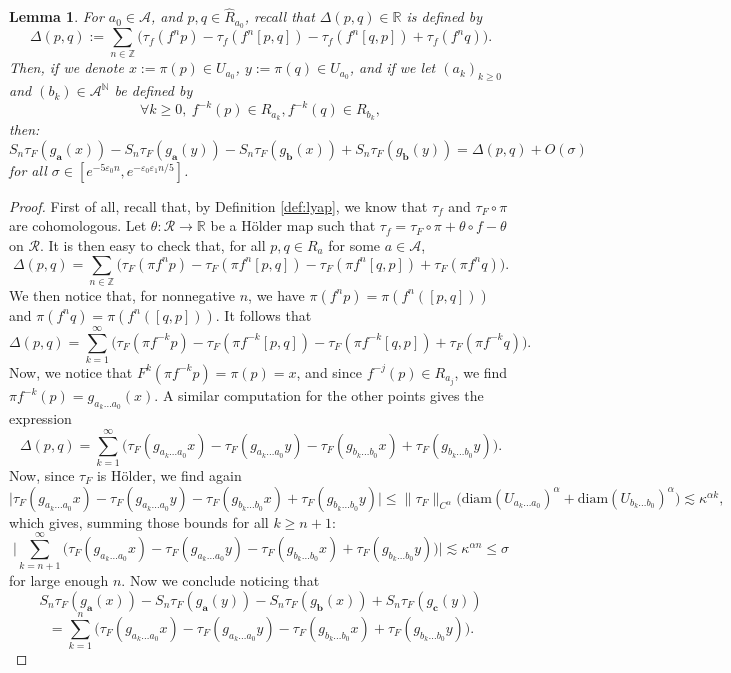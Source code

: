 \documentclass[a4paper]{article}
\newtheorem{lemma}[theorem]{Lemma}
\theoremstyle{definition}
\begin{document}
\begin{lemma}\label{lem:Delta1}
For $a_0 \in \mathcal{A}$, and $p,q \in \widehat{R}_{a_0}$, recall that $\Delta(p,q) \in \mathbb{R}$ is defined by
$$ \Delta(p,q) := \sum_{n \in \mathbb{Z}} \Big( \tau_f(f^n p) - \tau_f(f^n [p,q]) - \tau_f(f^n [q,p]) + \tau_f(f^n q) \Big). $$
Then, if we denote $x := \pi(p) \in U_{a_0}$, $y := \pi(q) \in U_{a_0}$, and if we let $(a_k)_{k \geq 0}$ and $(b_k) \in \mathcal{A}^\mathbb{N}$ be defined by $$\forall k \geq 0, \ f^{-k}(p) \in R_{a_k} , f^{-k}(q) \in R_{b_k} , $$
then:
$$ S_{n} \tau_F ( g_\mathbf{a}(x)) -  S_{n} \tau_F( g_\mathbf{a}(y)) -  S_{n} \tau_F( g_\mathbf{b}(x)) +  S_{n} \tau_F( g_\mathbf{b}(y)) = \Delta(p,q) + O(\sigma)  $$
for all $\sigma \in [e^{-5 \varepsilon_0 n}, e^{- \varepsilon_0 \varepsilon_1 n/5}]$.
\end{lemma}

\begin{proof}
First of all, recall that, by Definition \ref{def:lyap}, we know that $\tau_f$ and $\tau_F \circ \pi$ are cohomologous. Let $\theta : \mathcal{R} \rightarrow \mathbb{R}$ be a Hölder map such that $\tau_f = \tau_F \circ \pi + \theta \circ f - \theta$ on $\mathcal{R}$. It is then easy to check that, for all $p,q \in R_a$ for some $a \in \mathcal{A}$,
$$ \Delta(p,q) = 
 \sum_{n \in \mathbb{Z} } \Big( \tau_F( \pi f^n p) - \tau_F(\pi f^n [p,q]) - \tau_F(\pi f^n [q,p]) + \tau_F(\pi f^n q) \Big) .$$
We then notice that, for nonnegative $n$, we have $\pi(f^n p) = \pi(f^n([p,q]))$ and $\pi(f^n q) = \pi(f^n([q,p]))$. It follows that
$$ \Delta(p,q) = \sum_{k=1}^\infty \Big( \tau_F(\pi f^{-k} p) - \tau_F(\pi f^{-k} [p,q]) - \tau_F(\pi f^{-k} [q,p]) + \tau_F(\pi f^{-k} q) \Big). $$
Now, we notice that $F^k( \pi f^{-k} p ) = \pi(p) =x$, and since $f^{-j}(p) \in R_{a_j}$, we find $\pi f^{-k}(p) = g_{a_k \dots a_0}(x)$. A similar computation for the other points gives the expression
$$ \Delta(p,q) = \sum_{k=1}^\infty \Big( \tau_F(g_{a_k \dots a_0} x) - \tau_F(g_{a_k \dots a_0} y) - \tau_F(g_{b_k \dots b_0} x) + \tau_F(g_{b_k \dots b_0} y) \Big) .$$
Now, since $\tau_F$ is Hölder, we find again
$$ \Big| \tau_F(g_{a_k \dots a_0} x) - \tau_F(g_{a_k \dots a_0} y) - \tau_F(g_{b_k \dots b_0} x) + \tau_F(g_{b_k \dots b_0} y) \Big| \leq  \|\tau_F \|_{C^\alpha} \big( \text{diam}(U_{a_k \dots a_0})^\alpha + \text{diam}(U_{b_k \dots b_0})^\alpha  \big) \lesssim \kappa^{\alpha k} ,$$
which gives, summing those bounds for all $k \geq n+1$:
$$ \Big|\sum_{k=n+1}^\infty \Big(\tau_F(g_{a_k \dots a_0} x) - \tau_F(g_{a_k \dots a_0} y) - \tau_F(g_{b_k \dots b_0} x) + \tau_F(g_{b_k \dots b_0} y) \Big)\Big| \lesssim \kappa^{\alpha n} \leq \sigma $$
for large enough $n$. Now we conclude noticing that
$$ S_{n} \tau_F ( g_\mathbf{a}(x)) -  S_{n} \tau_F( g_\mathbf{a}(y)) -  S_{n} \tau_F( g_\mathbf{b}(x)) + S_n \tau_F (g_\mathbf{c}(y)) $$ $$ = \sum_{k=1}^n \Big(\tau_F(g_{a_k \dots a_0} x) - \tau_F(g_{a_k \dots a_0} y) - \tau_F(g_{b_k \dots b_0} x) + \tau_F(g_{b_k \dots b_0} y) \Big). $$
\end{proof}
\end{document}
